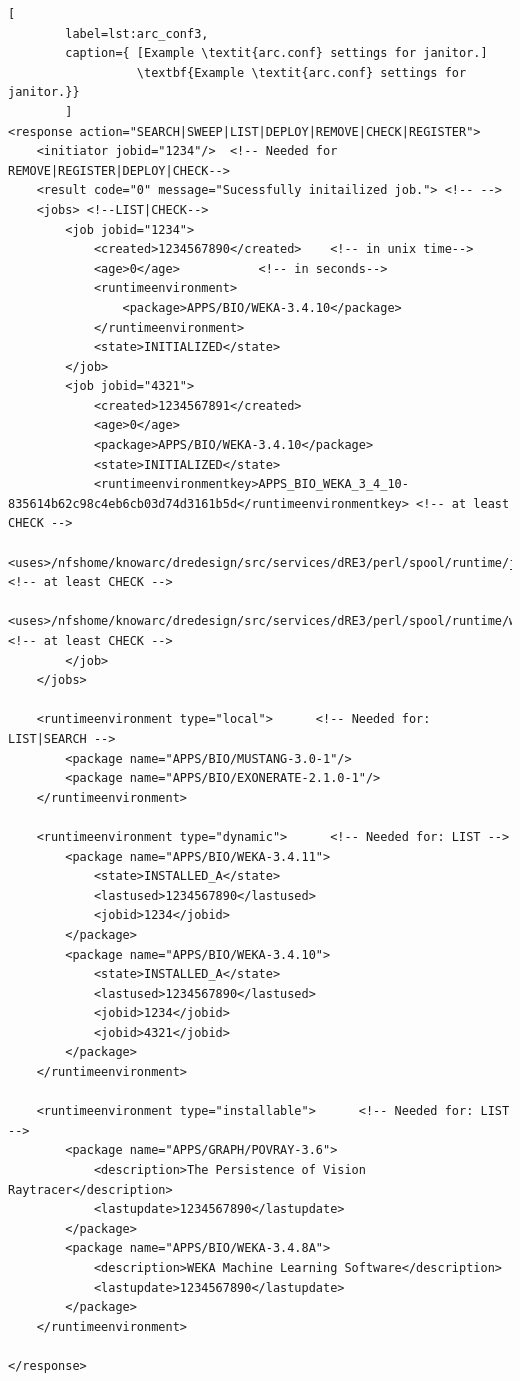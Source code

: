 \begin{lstlisting}[
        label=lst:arc_conf3,
        caption={ [Example \textit{arc.conf} settings for janitor.]
                  \textbf{Example \textit{arc.conf} settings for janitor.}}
        ]
<response action="SEARCH|SWEEP|LIST|DEPLOY|REMOVE|CHECK|REGISTER">
	<initiator jobid="1234"/>  <!-- Needed for REMOVE|REGISTER|DEPLOY|CHECK-->
	<result code="0" message="Sucessfully initailized job."> <!-- -->
	<jobs> <!--LIST|CHECK-->
		<job jobid="1234">
			<created>1234567890</created>    <!-- in unix time-->
			<age>0</age>           <!-- in seconds-->
			<runtimeenvironment>
				<package>APPS/BIO/WEKA-3.4.10</package>
			</runtimeenvironment>
			<state>INITIALIZED</state>
		</job>
		<job jobid="4321">
			<created>1234567891</created>
			<age>0</age>
			<package>APPS/BIO/WEKA-3.4.10</package>
			<state>INITIALIZED</state>
			<runtimeenvironmentkey>APPS_BIO_WEKA_3_4_10-835614b62c98c4eb6cb03d74d3161b5d</runtimeenvironmentkey> <!-- at least CHECK -->
			<uses>/nfshome/knowarc/dredesign/src/services/dRE3/perl/spool/runtime/jre__57T1ke1UVz/runtime</uses> <!-- at least CHECK -->
			<uses>/nfshome/knowarc/dredesign/src/services/dRE3/perl/spool/runtime/weka_wHfyytarlE/runtime</uses> <!-- at least CHECK -->
		</job>
	</jobs>

	<runtimeenvironment type="local">      <!-- Needed for: LIST|SEARCH -->
		<package name="APPS/BIO/MUSTANG-3.0-1"/>
		<package name="APPS/BIO/EXONERATE-2.1.0-1"/>
	</runtimeenvironment>

	<runtimeenvironment type="dynamic">      <!-- Needed for: LIST -->
		<package name="APPS/BIO/WEKA-3.4.11">
			<state>INSTALLED_A</state>
			<lastused>1234567890</lastused>
			<jobid>1234</jobid>
		</package>
		<package name="APPS/BIO/WEKA-3.4.10">
			<state>INSTALLED_A</state>
			<lastused>1234567890</lastused>
			<jobid>1234</jobid>
			<jobid>4321</jobid>
		</package>
	</runtimeenvironment>

	<runtimeenvironment type="installable">      <!-- Needed for: LIST -->
		<package name="APPS/GRAPH/POVRAY-3.6">
			<description>The Persistence of Vision Raytracer</description>
			<lastupdate>1234567890</lastupdate>
		</package>
		<package name="APPS/BIO/WEKA-3.4.8A">
			<description>WEKA Machine Learning Software</description>
			<lastupdate>1234567890</lastupdate>
		</package>
	</runtimeenvironment>

</response>
\end{lstlisting}


